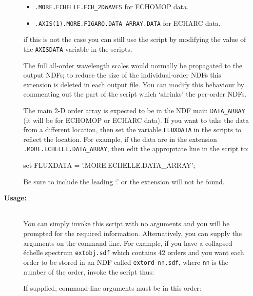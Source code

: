 \documentclass[twoside,11pt]{starlink}
\begin{document}
\begin{description}
\begin{itemize}
\item \verb+.MORE.ECHELLE.ECH_2DWAVES+ for ECHOMOP data.

\item \verb+.AXIS(1).MORE.FIGARO.DATA_ARRAY.DATA+ for ECHARC data.

\end{itemize}

     if this is not the case you can still use the script by modifying
     the value of the \verb+AXISDATA+ variable in the scripts.

     The full all-order wavelength scales
     would normally be propagated to the output NDFs; to reduce the
     size of the individual-order NDFs this extension is deleted in each
     output file.  You can modify this behaviour by commenting out the
     part of the script which `shrinks' the per-order NDFs.

     The main 2-D order array is expected to be in the NDF main
     \verb+DATA_ARRAY+ (it will be for ECHOMOP or ECHARC data).
     If you want to take the data from a different location, then
     set the variable \verb+FLUXDATA+ in the scripts to reflect
     the location.  For example, if the data are in the extension
     \verb+.MORE.ECHELLE.DATA_ARRAY+, then edit the appropriate line
     in the script to:

\begin{terminalv}
   set FLUXDATA = '.MORE.ECHELLE.DATA_ARRAY';
\end{terminalv}

     Be sure to include the leading `.' or the extension will not be
     found.

\item [\textbf{Usage:}] \mbox{} \\
     You can simply invoke this script with no arguments and you
     will be prompted for the required information.  Alternatively,
     you can supply the arguments on the command line.  For example,
     if you have a collapsed \'{e}chelle spectrum \verb+extobj.sdf+ which
     contains 42 orders and you want each order to be stored in an NDF
     called \texttt{extord\_nn.sdf}, where \verb+nn+ is the number of the
     order, invoke the script thus:

\begin{terminalv}
\end{terminalv}

     If supplied, command-line arguments must be in this order:

\begin{enumerate}


\end{enumerate}
\end{description}
\end{document}
